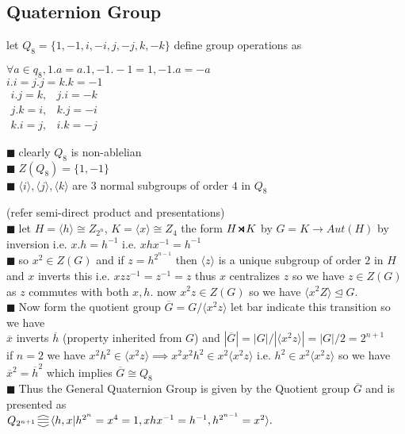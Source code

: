 \documentclass[11pt]{extarticle}
\newcommand{\ra}{\rightarrow}
\newcommand{\y}{$\blacksquare\;$}
\newcommand{\smdp}{ \,
\begin{tikzpicture}
	\draw[thick] (0,0)--(1ex,1ex)--(1ex,0)--(0,1ex);
\end{tikzpicture} 
\,
}
\newcommand{\gen}[1]{\langle #1 \rangle}
\newcommand{\pst}{ \,\rotatebox[origin=c]{90}{$ \gen{||} $} \,}
\newcommand{\tbx}[2][]{
	\begin{tcolorbox}[enhanced,breakable,size=small,colback=black!2!white,title={#1},arc is angular, arc=1.5mm,drop fuzzy shadow]
		#2
	\end{tcolorbox}
}
\begin{document}
\begin{multicols}{2}
	\subsection{Quaternion Group}
\tbx{ let $ Q_8=\{1,-1,i,-i,j,-j,k,-k\} $ define group operations as
	
	\begin{center}

	$ \forall a\in q_8,1.a=a.1,-1.-1=1,-1.a=-a $ \\
	$ i.i=j.j=k.k=-1 $ \\
	$ \begin{matrix}
		i.j=k,& j.i=-k\\
		j.k=i,& k.j=-i\\
		k.i=j,& i.k=-j
	\end{matrix} $  
		
\end{center}
}
\tbx{ 
\y clearly $ Q_8 $ is non-ablelian\\
\y $ Z(Q_8)=\{1,-1\} $ \\
 \y $\gen{i},\gen{j},\gen{k}$ are 3 normal subgroups of order $ 4 $ in $ Q_8 $ }
 \tbx[Generalised Quaternion Group ]{ (refer semi-direct product and presentations)\\
 \y let $ H=\gen{h}\cong Z_{2^n} $, $ K=\gen{x}\cong Z_4 $  the form $ H\smdp K $ by $ G= K\ra Aut(H) $ by inversion i.e. $ x.h=h^{-1} $ i.e. $ xhx^{-1}=h^{-1} $ \\
\y so $ x^2\in  Z(G) $  and if $ z=h^{2^{n-1}} $ then $ \gen{z} $ is a unique subgroup of order $ 2 $ in $ H $ and $ x $ inverts this i.e. $ xzz^{-1}=z^{-1}=z $ thus $ x $ centralizes $ z $ so we have $ z\in Z(G) $ as $ z $ commutes with both $ x,h $. now $ x^2z\in Z(G) $ so we have $ \gen{x^2Z}\trianglelefteq G $.\\
 \y Now form the quotient group $ \overline{G}=G/\gen{x^2z}$ let bar indicate this transition so we have\\
 $ \overline{x} $ inverts $ \overline{h} $ (property inherited from $ G $) and $ |\overline{G}|=|G|/|\gen{x^2z}|=|G|/2=2^{n+1} $ \\
 if $ n=2 $ we have $ {x}^2{h}^{2}\in \gen{x^2z}\implies {x}^2{x}^2{h}^{2}\in x^2\gen{x^2z}$ i.e. $ h^2 \in x^2\gen{x^2z}$ so we have $ \overline{x}^2=\overline{h}^2 $ which implies $ \overline{G}\cong Q_8 $ \\
\y Thus the General Quaternion Group is given by the Quotient group $\overline{G}$ and is presented as 
\\ $ Q_{2^{n+1}} \pst \gen{ h,x |h^{2^n}=x^4=1,xhx^{-1}=h^{-1},h^{2^{n-1}}=x^2}.$ 
  } 
  \newcolumn

\end{multicols}
\end{document}
